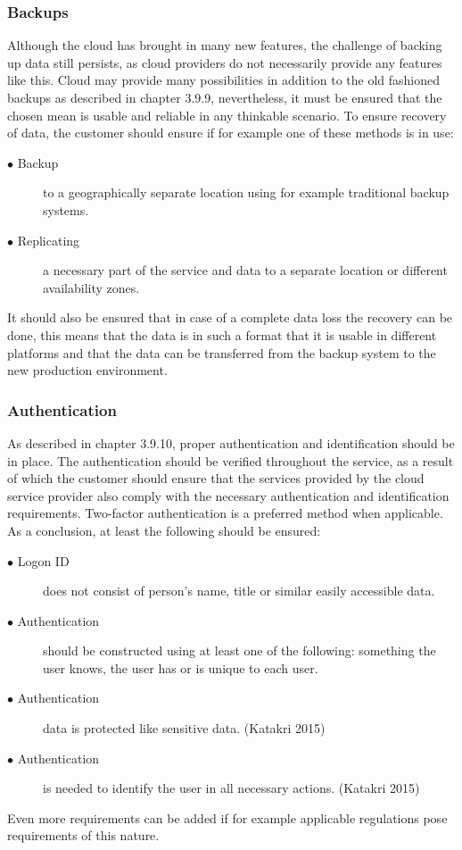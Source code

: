\documentclass{article}
\begin{document}
\subsubsection{Backups}
Although the cloud has brought in many new features, the challenge of backing up data still persists, as cloud providers do not necessarily provide any features like this. Cloud may provide many possibilities in addition to the old fashioned backups as described in chapter 3.9.9, nevertheless, it must be ensured that the chosen mean is usable and reliable in any thinkable scenario. To ensure recovery of data, the customer should ensure if for example one of these methods is in use:
\begin{description}
	\item[$\bullet$ Backup] to a geographically separate location using for example traditional backup systems.
	\item[$\bullet$ Replicating] a necessary part of the service and data to a separate location or different availability zones.
\end{description}
It should also be ensured that in case of a complete data loss the recovery can be done, this means that the data is in such a format that it is usable in different platforms and that the data can be transferred from the backup system to the new production environment.

\subsubsection{Authentication}
As described in chapter 3.9.10, proper authentication and identification should be in place. The authentication should be verified throughout the service, as a result of which the customer should ensure that the services provided by the cloud service provider also comply with the necessary authentication and identification requirements. Two-factor authentication is a preferred method when applicable. As a conclusion, at least the following should be ensured:
\begin{description}
	\item[$\bullet$ Logon ID] does not consist of person's name, title or similar easily accessible data.
	\item[$\bullet$ Authentication] should be constructed using at least one of the following: something the user knows, the user has or is unique to each user.
	\item[$\bullet$ Authentication] data is protected like sensitive data. (Katakri 2015)
	\item[$\bullet$ Authentication] is needed to identify the user in all necessary actions. (Katakri 2015)
\end{description}
Even more requirements can be added if for example applicable regulations pose requirements of this nature.
\end{document}
